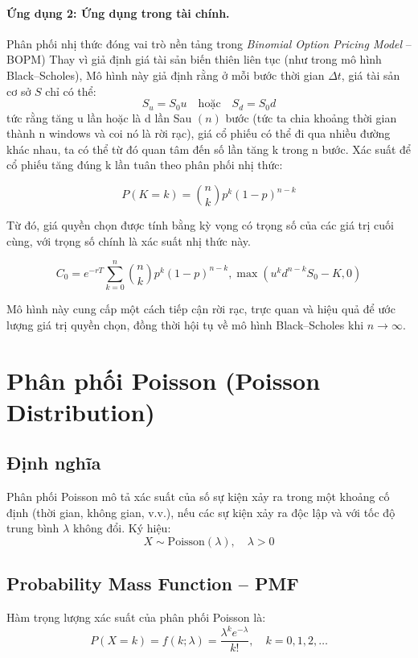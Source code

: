 \paragraph{Ứng dụng 2: Ứng dụng trong tài chính.} 
Phân phối nhị thức đóng vai trò nền tảng trong  
\textit{Binomial Option Pricing Model} – BOPM)  
Thay vì giả định giá tài sản biến thiên liên tục (như trong mô hình Black–Scholes), 
Mô hình này giả định rằng ở mỗi bước thời gian $\Delta t$, giá tài sản cơ sở $S$ chỉ có thể:
\[
S_u = S_0 u \quad \text{hoặc} \quad S_d = S_0 d
\]
tức rằng tăng u lần hoặc là d lần
Sau $( n )$ bước (tức ta chia khoảng thời gian thành n windows và coi nó là rời rạc),
 giá cổ phiếu có thể đi qua nhiều đường khác nhau, ta có thể từ đó quan tâm đến
số lần tăng  k  trong  n  bước.
Xác suất để cổ phiếu tăng đúng  k  lần tuân theo phân phối nhị thức:

$$
P(K = k) = \binom{n}{k} p^k (1 - p)^{n-k}
$$

Từ đó, giá quyền chọn được tính bằng kỳ vọng có trọng số của các giá trị cuối cùng, với trọng số chính là xác suất nhị thức này.

$$
C_0 = e^{-rT} \sum_{k=0}^{n} \binom{n}{k} p^k (1 - p)^{n-k} , \max(u^k d^{n-k} S_0 - K, 0)
$$

Mô hình này cung cấp một cách tiếp cận rời rạc, trực quan và hiệu quả để ước lượng giá trị quyền chọn, 
đồng thời hội tụ về mô hình Black–Scholes khi $n \to \infty$.


\section{Phân phối Poisson (Poisson Distribution)}

\subsection{Định nghĩa}

Phân phối Poisson mô tả xác suất của số sự kiện xảy ra trong một khoảng cố định (thời gian, không gian, v.v.),  
nếu các sự kiện xảy ra độc lập và với tốc độ trung bình $\lambda$ không đổi.  
Ký hiệu:
\[
X \sim \mathrm{Poisson}(\lambda), \quad \lambda > 0
\]

\subsection{Probability Mass Function – PMF}

Hàm trọng lượng xác suất của phân phối Poisson là:
\[
P(X = k) = f(k; \lambda) = \frac{\lambda^k e^{-\lambda}}{k!}, \quad k = 0, 1, 2, \dots
\]

